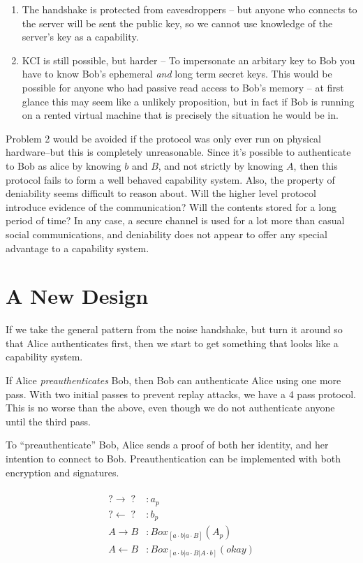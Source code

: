 \documentclass[12pt]{article}
\begin{document}
\begin{enumerate}
  \item The handshake is protected from eavesdroppers -- but
  anyone who connects to the server will be sent the public key,
  so we cannot use knowledge of the server's key as a capability.
  \item KCI is still possible, but harder -- To impersonate an
  arbitary key to Bob you have to know Bob's ephemeral \emph{and} long
  term secret keys. This would be possible for anyone who had
  passive read access to Bob's memory -- at first
  glance this may seem like a unlikely proposition, but in fact
  if Bob is running on a rented virtual machine that
  is precisely the situation he would be in.
\end{enumerate}

Problem 2 would be avoided if the protocol was only ever run on
physical hardware--but this is completely unreasonable.
Since it's possible to authenticate to Bob as alice by knowing
$b$ and $B$, and not strictly by knowing $A$, then this protocol
fails to form a well behaved capability system. Also, the property
of deniability seems difficult to reason about. Will the higher level
protocol introduce evidence of the communication? Will the contents
stored for a long period of time? In any case, a secure channel is
used for a lot more than casual social communications, and deniability
does not appear to offer any special advantage to a capability system.

\section{A New Design}

If we take the general pattern from the noise handshake,
but turn it around so that Alice authenticates first,
then we start to get something that looks like a capability system.

If Alice \emph{preauthenticates} Bob, then Bob can authenticate
Alice using one more pass. With two initial passes to prevent
replay attacks, we have a 4 pass protocol. This is no worse
than the above, even though we do not authenticate anyone
until the third pass.

To ``preauthenticate'' Bob, Alice sends a proof of both her identity,
and her intention to connect to Bob. Preauthentication can be
implemented with both encryption and signatures.

$$
\begin{align*}
\\
    ? \to \;?\; &: a_p  \\
    ? \gets \;?\; &: b_p \\
    A \to B &: Box_{[a \cdot b | a \cdot B]}(A_p) \\
    A \gets B &: Box_{[a \cdot b | a \cdot B | A \cdot b]}(okay)\\
\\
\end{align*}
$$
\end{document}
